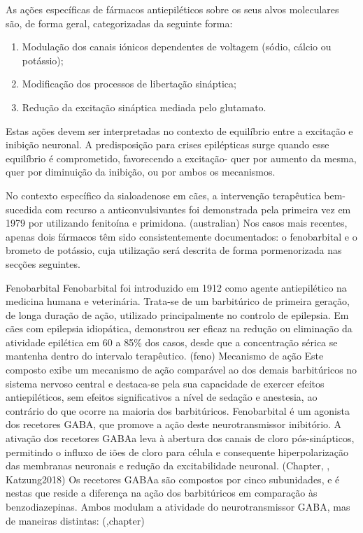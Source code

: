 As ações específicas de fármacos antiepiléticos sobre os seus alvos moleculares são, de forma geral, categorizadas da seguinte forma: \cite{Katzung2018}

\begin{enumerate}
    \item	Modulação dos canais iónicos dependentes de voltagem (sódio, cálcio ou potássio);
    \item Modificação dos processos de libertação sináptica;
    \item Redução da excitação sináptica mediada pelo glutamato.
\end{enumerate}

Estas ações devem ser interpretadas no contexto de equilíbrio entre a excitação e inibição neuronal. A predisposição para crises epilépticas surge quando esse equilíbrio é comprometido, favorecendo a excitação- quer por aumento da mesma, quer por diminuição da inibição, ou por ambos os mecanismos.\cite{Katzung2018}


No contexto específico da sialoadenose em cães, a intervenção terapêutica bem-sucedida com recurso a anticonvulsivantes foi demonstrada pela primeira vez em 1979 por \cite{Kelly2017} utilizando fenitoína e primidona. (australian) Nos casos mais recentes, apenas dois fármacos têm sido consistentemente documentados: o fenobarbital e o brometo de potássio, cuja utilização será descrita de forma pormenorizada nas secções seguintes.


Fenobarbital
Fenobarbital foi introduzido em 1912 como agente antiepilético na medicina humana e veterinária. \cite{Yasiry2012}\cite{Jukier2023} Trata-se de um barbitúrico de primeira geração, de longa duração de ação, utilizado principalmente no controlo de epilepsia. \cite{Papich2021}\cite{Scott2021} Em cães com epilepsia idiopática, demonstrou ser eficaz na redução ou eliminação da atividade epilética em 60 a 85\% dos casos, desde que a concentração sérica se mantenha dentro do intervalo terapêutico. (feno)
Mecanismo de ação 
Este composto exibe um mecanismo de ação comparável ao dos demais barbitúricos no sistema nervoso central e destaca-se pela sua capacidade de exercer efeitos antiepiléticos, sem efeitos significativos a nível de sedação e anestesia, ao contrário do que ocorre na maioria dos barbitúricos. \cite{Papich2021}
 Fenobarbital é um agonista dos recetores GABA, que promove a ação deste neurotransmissor inibitório. A ativação dos recetores GABAa leva à abertura dos canais de cloro pós-sinápticos, permitindo o influxo de iões de cloro para célula e consequente hiperpolarização das membranas neuronais e redução da excitabilidade neuronal. (Chapter, \cite{Papich2021}, Katzung2018) Os recetores GABAa são compostos por cinco subunidades, e é nestas que reside a diferença na ação dos barbitúricos em comparação às benzodiazepinas. Ambos modulam a atividade do neurotransmissor GABA, mas de maneiras distintas: (\cite{Trinka2023},chapter)

